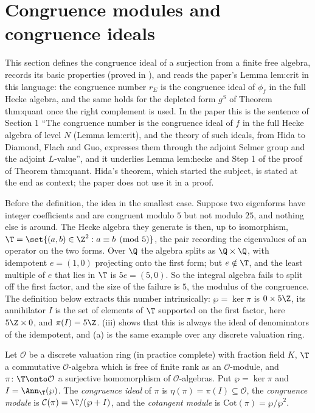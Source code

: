\section{Congruence modules and congruence ideals}\label{sec:congruence:modules}

This section defines the congruence ideal of a surjection from a finite free algebra, records its basic properties (proved in ),
and reads the paper's Lemma lem:crit in this language: the congruence number $r_E$ is the congruence ideal of $\phi_f$ in the full Hecke algebra, and
the same holds for the depleted form $g^S$ of Theorem thm:quant once the right complement is used. In the paper this is the sentence of Section 1
``The congruence number is the congruence ideal of $f$ in the full Hecke algebra of level $N$ (Lemma lem:crit), and the theory of such ideals, from Hida to
Diamond, Flach and Guo, expresses them through the adjoint Selmer group and the adjoint $L$-value'', and it underlies Lemma lem:hecke and Step 1 of the proof
of Theorem thm:quant. Hida's theorem, which started the subject, is stated at the end as context; the paper does not use it in a proof.

Before the definition, the idea in the smallest case. Suppose two eigenforms have integer coefficients and are congruent modulo $5$ but not modulo $25$, and nothing else is around. The Hecke
algebra they generate is then, up to isomorphism, $\T=\set{(a,b)\in\Z^2:a\equiv b\pmod5}$, the pair recording the eigenvalues of an operator on the two forms. Over $\Q$ the algebra splits as
$\Q\times\Q$, with idempotent $e=(1,0)$ projecting onto the first form; but $e\notin\T$, and the least multiple of $e$ that lies in $\T$ is $5e=(5,0)$. So the integral algebra fails to split off the
first factor, and the size of the failure is $5$, the modulus of the congruence. The definition below extracts this number intrinsically: $\wp=\ker\pi$ is $0\times5\Z$, its annihilator $I$ is the set
of elements of $\T$ supported on the first factor, here $5\Z\times0$, and $\pi(I)=5\Z$. (iii) shows that this is always the ideal of denominators of the
idempotent, and (a) is the same example over any discrete valuation ring.

\begin{definition}\label{def:congruence:congruence-module}
Let $\mathcal O$ be a discrete valuation ring (in practice complete) with fraction field $K$, $\T$ a commutative $\mathcal O$-algebra which is free of finite rank as an $\mathcal O$-module, and
$\pi\colon\T\onto\mathcal O$ a surjective homomorphism of $\mathcal O$-algebras. Put $\wp=\ker\pi$ and $I=\Ann_\T(\wp)$. The \emph{congruence ideal} of $\pi$ is $\eta(\pi)=\pi(I)\subseteq\mathcal O$, the
\emph{congruence module} is $\mathcal C(\pi)=\T/(\wp+I)$, and the \emph{cotangent module} is $\mathrm{Cot}(\pi)=\wp/\wp^2$.
\end{definition}

